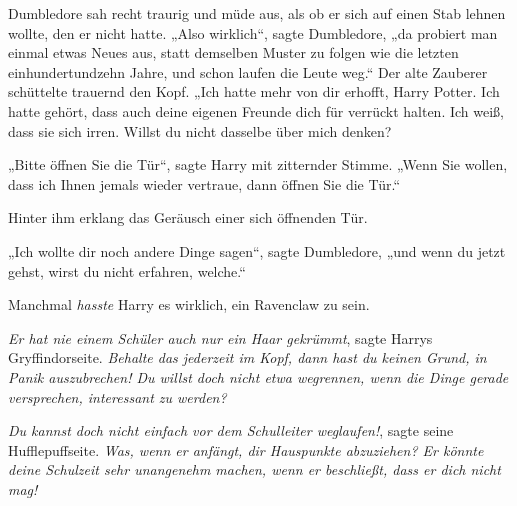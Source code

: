 Dumbledore sah recht traurig und müde aus, als ob er sich auf einen Stab lehnen wollte, den er nicht hatte.
„Also wirklich“, sagte Dumbledore, „da probiert man einmal etwas Neues aus, statt demselben Muster zu folgen wie die letzten einhundertundzehn Jahre, und schon laufen die Leute weg.“ Der alte Zauberer schüttelte trauernd den Kopf. „Ich hatte mehr von dir erhofft, Harry Potter. Ich hatte gehört, dass auch deine eigenen Freunde dich für verrückt halten. Ich weiß, dass sie sich irren. Willst du nicht dasselbe über mich denken?

„Bitte öffnen Sie die Tür“, sagte Harry mit zitternder Stimme. „Wenn Sie wollen, dass ich Ihnen jemals wieder vertraue, dann öffnen Sie die Tür.“

Hinter ihm erklang das Geräusch einer sich öffnenden Tür.

„Ich wollte dir noch andere Dinge sagen“, sagte Dumbledore, „und wenn du jetzt gehst, wirst du nicht erfahren, welche.“

Manchmal \emph{hasste} Harry es wirklich, ein Ravenclaw zu sein.

\emph{Er hat nie einem Schüler auch nur ein Haar gekrümmt}, sagte Harrys Gryffindorseite. \emph{Behalte das jederzeit im Kopf, dann hast du keinen Grund, in Panik auszubrechen! Du willst doch nicht etwa wegrennen, wenn die Dinge gerade versprechen, interessant zu werden?}

\emph{Du kannst doch nicht einfach vor dem Schulleiter weglaufen!}, sagte seine Hufflepuffseite. \emph{Was, wenn er anfängt, dir Hauspunkte abzuziehen? Er könnte deine Schulzeit sehr unangenehm machen, wenn er beschließt, dass er dich nicht mag!}


